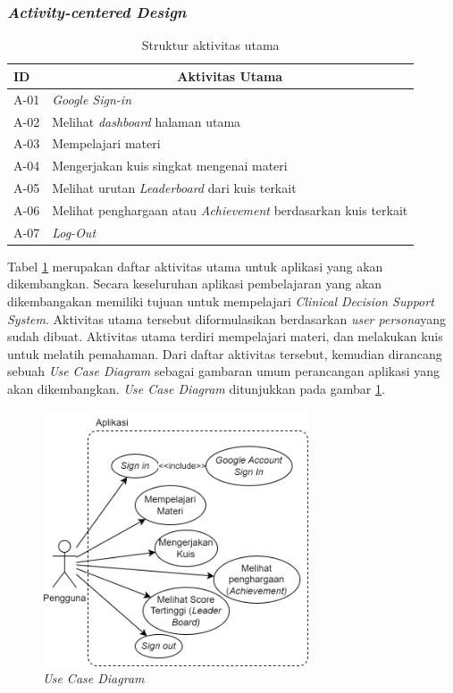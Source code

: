 \subsubsection{\textit{Activity-centered Design}}
\begin{table}[H]
	\centering
	\caption{Struktur aktivitas utama}
	\begin{tabular}{|m{1cm}|m{}|}
		\hline
		\centering \textbf{ID} & \multicolumn{1}{c|}{\centering \textbf{Aktivitas Utama}}\\
		\hline
		A-01 & \textit{Google Sign-in} \\
		\hline
		A-02 & Melihat \textit{dashboard} halaman utama\\
		\hline
		A-03 & Mempelajari materi\\
		\hline
		A-04 & Mengerjakan kuis singkat mengenai materi \\
		\hline
		A-05 & Melihat urutan \textit{Leaderboard} dari kuis terkait\\
		\hline
		A-06 & Melihat penghargaan atau \textit{Achievement} berdasarkan kuis terkait \\
		\hline
		A-07 & \textit{Log-Out}\\
		\hline
	\end{tabular}
	\label{Tab: Tabel Main Activity}
\end{table}
Tabel \ref*{Tab: Tabel Main Activity} merupakan daftar aktivitas utama untuk aplikasi yang akan dikembangkan.
Secara keseluruhan aplikasi pembelajaran yang akan dikembangakan memiliki tujuan untuk mempelajari \textit{Clinical Decision Support System}. 
Aktivitas utama tersebut diformulasikan berdasarkan \textit{user persona}yang sudah dibuat. Aktivitas utama terdiri mempelajari materi, dan melakukan kuis untuk melatih pemahaman.
Dari daftar aktivitas tersebut, kemudian dirancang sebuah \textit{Use Case Diagram} sebagai gambaran umum perancangan aplikasi yang akan dikembangkan. \textit{Use Case Diagram} ditunjukkan pada gambar \ref*{Fig:Use Case Diagram}. 
\begin{figure}[H]
	\centering
	\includegraphics[width=0.7\textwidth]{contents/chapter-3/images/Use-Case-Diagram.png}
	\caption{\textit{Use Case Diagram}}
	\label{Fig:Use Case Diagram}
\end{figure}

